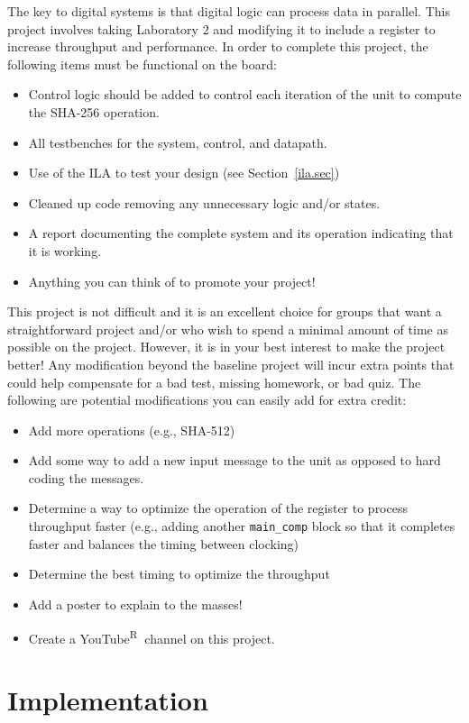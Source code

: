 \documentclass{article}
\begin{document}
The key to digital systems is that digital logic can process data in
parallel.  This project involves taking Laboratory $2$ and modifying
it to include a register to increase throughput and performance.
In order to complete this project, the following items must be
functional on the board:
\begin{itemize}
\item Control logic should be added to control each iteration of the
  unit to compute the SHA-256 operation.
\item All testbenches for the system, control, and datapath.
\item Use of the ILA to test your design (see Section~\ref{ila.sec})
\item Cleaned up code removing any unnecessary logic and/or states.
\item A report documenting the complete system and its operation
  indicating that it is working.
\item Anything you can think of to promote your project!
\end{itemize}

This project is not difficult and it is an excellent
choice for groups that want a straightforward
project and/or who wish to spend a minimal amount of time as possible on the project. However,
it is in your best interest to make the project better! Any modification beyond the baseline
project will incur extra points that could help compensate for a bad test, missing homework, or
bad quiz. The following are potential modifications you can easily add
for extra credit:
\begin{itemize}
\item Add more operations (e.g., SHA-512)
\item Add some way to add a new input message to the unit as opposed
  to hard coding the messages.
\item Determine a way to optimize the operation of the register to
  process throughput faster (e.g., adding another \verb!main_comp!
  block so that it completes faster and balances the timing between clocking)
\item Determine the best timing to optimize the throughput
\item Add a poster to explain to the masses!
\item Create a YouTube\textsuperscript{\textcircled{R}} channel on this project.
\end{itemize}

\section{Implementation}
\label{implementation.sec}
\end{document}
